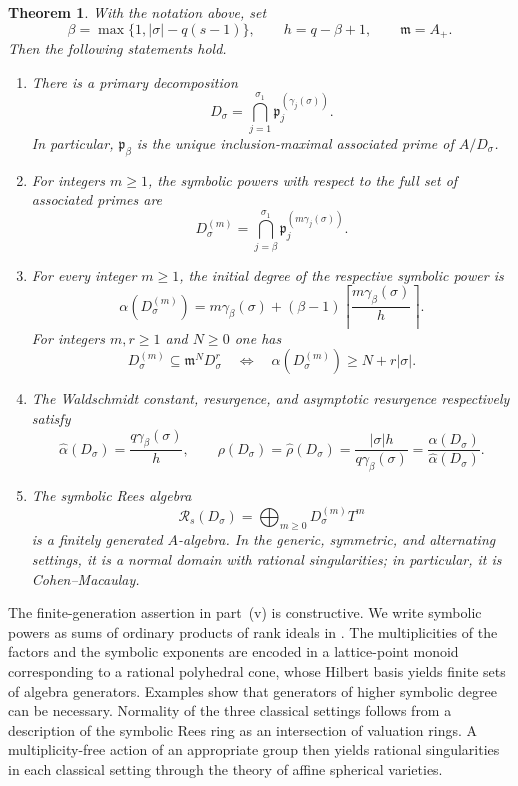 \documentclass[11pt,reqno]{amsart}
\numberwithin{equation}{subsection}
\newtheorem{theorem}[equation]{Theorem}
\theoremstyle{definition}
\theoremstyle{remark}
\newcommand{\cR}{\mathcal R}
\newcommand{\fp}{\mathfrak p}
\newcommand{\fm}{\mathfrak m}
\begin{document}
\begin{theorem}\label{thm:intro-main}
With the notation above, set
\[
 \beta=\max\{1,|\sigma|-q(s-1)\},
 \qquad h=q-\beta+1,
 \qquad \fm=A_+.
\]
Then the following statements hold.
\begin{enumerate}[label=\textup{(\roman*)}]
\item There is a primary decomposition
\[
 D_\sigma=\bigcap_{j=1}^{\sigma_1}
                 \fp_j^{(\gamma_j(\sigma))}.
\]
In particular, $\fp_\beta$ is the unique inclusion-maximal
associated prime of $A/D_\sigma$.

\item For integers $m\ge1$, the symbolic powers with respect
to the full set of associated primes are
\[
 D_\sigma^{(m)}
       =\bigcap_{j=\beta}^{\sigma_1}
                    \fp_j^{(m\gamma_j(\sigma))}.
\]

\item For every integer $m\ge1$, the initial degree of the respective symbolic power is 
\[
 \alpha(D_\sigma^{(m)})
       =m\gamma_\beta(\sigma)
          +(\beta-1)
             \left\lceil\frac{m\gamma_\beta(\sigma)}h\right\rceil.
\]
For integers $m,r\ge1$ and $N\ge0$ one has
\[
 D_\sigma^{(m)}\subseteq\fm^N D_\sigma^r
 \quad\Longleftrightarrow\quad
 \alpha(D_\sigma^{(m)})\ge N+r|\sigma|.
\]

\item The Waldschmidt constant, resurgence, and asymptotic
resurgence respectively satisfy
\[
 \widehat\alpha(D_\sigma)
       =\frac{q\gamma_\beta(\sigma)}h,
 \qquad
 \rho(D_\sigma)=\widehat\rho(D_\sigma)
       =\frac{|\sigma|h}{q\gamma_\beta(\sigma)}
       =\frac{\alpha(D_\sigma)}{\widehat\alpha(D_\sigma)}.
\]

\item The symbolic Rees algebra
\[
 \cR_s(D_\sigma)
   =\bigoplus_{m\ge0}D_\sigma^{(m)}T^m
\]
is a finitely generated $A$-algebra.
In the generic, symmetric, and alternating settings, it is
a normal domain with rational singularities; in particular, it is Cohen--Macaulay.
\end{enumerate}
\end{theorem}


The finite-generation assertion in part~\textup{(v)} is constructive. We write symbolic powers as sums of ordinary products of rank ideals in . The multiplicities of the factors and the symbolic exponents are encoded in a lattice-point monoid corresponding to a rational polyhedral cone, whose Hilbert basis yields finite sets of algebra generators. Examples show that generators of higher symbolic degree can be necessary. Normality of the three classical settings follows from a description  of the symbolic Rees ring as an intersection of valuation rings. A multiplicity-free action of an appropriate group  then yields rational singularities in each classical setting through the theory of affine spherical varieties.
\end{document}
